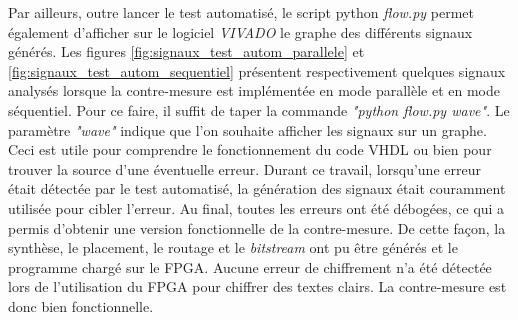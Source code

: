 \documentclass[oneside]{book}
\begin{document}
Par ailleurs, outre lancer le test automatisé, le script python \textit{flow.py} permet également d'afficher sur le logiciel \textit{VIVADO} le graphe des différents signaux générés. Les figures  \ref{fig:signaux_test_autom_parallele} et \ref{fig:signaux_test_autom_sequentiel} présentent respectivement quelques signaux analysés lorsque la contre-mesure est implémentée en mode parallèle et en mode séquentiel. Pour ce faire, il suffit de taper la commande \textit{"python flow.py wave"}. Le paramètre \textit{"wave"} indique que l'on souhaite afficher les signaux sur un graphe. Ceci est utile pour comprendre le fonctionnement du code VHDL ou bien pour trouver la source d'une éventuelle erreur. Durant ce travail, lorsqu'une erreur était détectée par le test automatisé, la génération des signaux était couramment utilisée pour cibler l'erreur. Au final, toutes les erreurs ont été débogées, ce qui a permis d'obtenir une version fonctionnelle de la contre-mesure. De cette façon, la synthèse, le placement, le routage et le \textit{bitstream} ont pu être générés et le programme chargé sur le FPGA. Aucune erreur de chiffrement n'a été détectée lors de l'utilisation du FPGA pour chiffrer des textes clairs. La contre-mesure est donc bien fonctionnelle.
\end{document}

